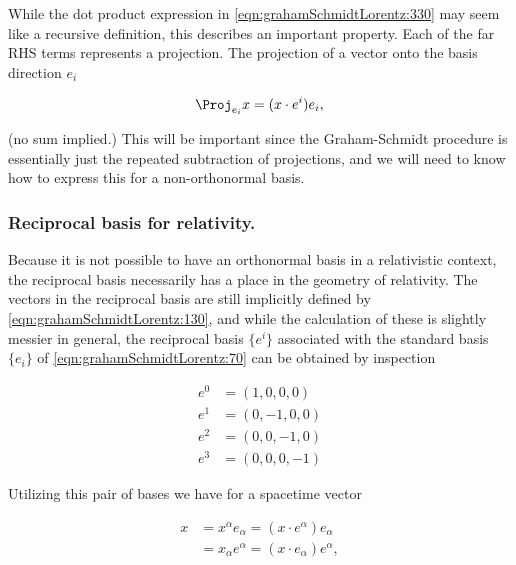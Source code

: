 \documentclass[iop,onecolumn]{emulateapj}
\begin{document}
While the dot product expression in \ref{eqn:grahamSchmidtLorentz:330} may seem like a recursive definition, this describes an important property.  Each of the far RHS terms represents a projection.  The projection of a vector onto the basis direction $e_i$

\begin{equation}\label{eqn:grahamSchmidtLorentz:560}
\Proj_{e_i} x = (x \cdot e^i) e_i,
\end{equation}

(no sum implied.)  This will be important since the Graham-Schmidt procedure is essentially just the repeated subtraction of projections, and we will need to know how to express this for a non-orthonormal basis.

\subsubsection{Reciprocal basis for relativity.}

Because it is not possible to have an orthonormal basis in a relativistic context, the reciprocal basis necessarily has a place in the geometry of relativity.  The vectors in the reciprocal basis are still implicitly defined by \ref{eqn:grahamSchmidtLorentz:130}, and while the calculation of these is slightly messier in general, the reciprocal basis $\{e^i\}$ associated with the standard basis $\{e_i\}$ of \ref{eqn:grahamSchmidtLorentz:70} can be obtained by inspection

\begin{equation}\label{eqn:grahamSchmidtLorentz:70b}
\begin{aligned}
e^0 &= (1, 0, 0, 0) \\
e^1 &= (0, -1, 0, 0) \\
e^2 &= (0, 0, -1, 0) \\
e^3 &= (0, 0, 0, -1)
\end{aligned}
\end{equation}

Utilizing this pair of bases we have for a spacetime vector

\begin{equation}\label{eqn:grahamSchmidtLorentz:331}
\begin{aligned}
x &= x^\alpha e_\alpha = (x \cdot e^\alpha) e_\alpha \\
  &= x_\alpha e^\alpha = (x \cdot e_\alpha) e^\alpha,
\end{aligned}
\end{equation}
\end{document}
